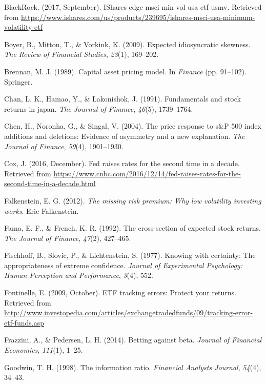 \documentclass[12pt,twoside]{reedthesis}
\theoremstyle{definition}
\theoremstyle{definition}
\theoremstyle{definition}
\theoremstyle{remark}
\begin{document}
\hypertarget{ref-blackrock2017}{}
BlackRock. (2017, September). IShares edge msci min vol usa etf
\textbar{} usmv. Retrieved from
\url{https://www.ishares.com/us/products/239695/ishares-msci-usa-minimum-volatility-etf}

\hypertarget{ref-boyer2009}{}
Boyer, B., Mitton, T., \& Vorkink, K. (2009). Expected idiosyncratic
skewness. \emph{The Review of Financial Studies}, \emph{23}(1),
169--202.

\hypertarget{ref-brennan1989}{}
Brennan, M. J. (1989). Capital asset pricing model. In \emph{Finance}
(pp. 91--102). Springer.

\hypertarget{ref-chan1991}{}
Chan, L. K., Hamao, Y., \& Lakonishok, J. (1991). Fundamentals and stock
returns in japan. \emph{The Journal of Finance}, \emph{46}(5),
1739--1764.

\hypertarget{ref-chen2004}{}
Chen, H., Noronha, G., \& Singal, V. (2004). The price response to s\&P
500 index additions and deletions: Evidence of asymmetry and a new
explanation. \emph{The Journal of Finance}, \emph{59}(4), 1901--1930.

\hypertarget{ref-cox2016}{}
Cox, J. (2016, December). Fed raises rates for the second time in a
decade. Retrieved from
\url{https://www.cnbc.com/2016/12/14/fed-raises-rates-for-the-second-time-in-a-decade.html}

\hypertarget{ref-falkenstein2012}{}
Falkenstein, E. G. (2012). \emph{The missing risk premium: Why low
volatility investing works}. Eric Falkenstein.

\hypertarget{ref-fama1992}{}
Fama, E. F., \& French, K. R. (1992). The cross-section of expected
stock returns. \emph{The Journal of Finance}, \emph{47}(2), 427--465.

\hypertarget{ref-fischhoff1977}{}
Fischhoff, B., Slovic, P., \& Lichtenstein, S. (1977). Knowing with
certainty: The appropriateness of extreme confidence. \emph{Journal of
Experimental Psychology: Human Perception and Performance}, \emph{3}(4),
552.

\hypertarget{ref-fontinelle2009}{}
Fontinelle, E. (2009, October). ETF tracking errors: Protect your
returns. Retrieved from
\url{http://www.investopedia.com/articles/exchangetradedfunds/09/tracking-error-etf-funds.asp}

\hypertarget{ref-frazzini2014}{}
Frazzini, A., \& Pedersen, L. H. (2014). Betting against beta.
\emph{Journal of Financial Economics}, \emph{111}(1), 1--25.

\hypertarget{ref-goodwin1998}{}
Goodwin, T. H. (1998). The information ratio. \emph{Financial Analysts
Journal}, \emph{54}(4), 34--43.
\end{document}
